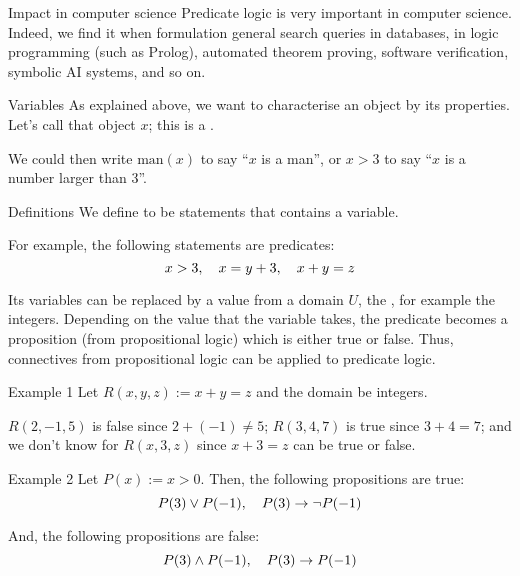 \documentclass{article}
\begin{document}
\begin{parag}{Impact in computer science}
    Predicate logic is very important in computer science. Indeed, we find it when formulation general search queries in databases, in logic programming (such as Prolog), automated theorem proving, software verification, symbolic AI systems, and so on.
\end{parag}

\begin{parag}{Variables}
    As explained above, we want to characterise an object by its properties. Let's call that object $x$; this is a .

    We could then write $\text{man}\left(x\right)$ to say ``$x$ is a man'', or $x > 3$ to say ``$x$ is a number larger than 3''.
\end{parag}

\begin{parag}{Definitions}
    We define  to be statements that contains a variable.

    For example, the following statements are predicates: 
    \[x > 3, \quad x = y + 3, \quad x + y = z\]
    
    Its variables can be replaced by a value from a domain $U$, the , for example the integers. Depending on the value that the variable takes, the predicate becomes a proposition (from propositional logic) which is either true or false. Thus, connectives from propositional logic can be applied to predicate logic.
\end{parag}

\begin{parag}{Example 1}
    Let $R\left(x, y, z\right) := x + y = z$ and the domain be integers.

    $R\left(2, -1, 5\right)$ is false since $2 + \left(-1\right) \neq 5$; $R\left(3, 4, 7\right)$ is true since $3 + 4 = 7$; and we don't know for $R\left(x, 3, z\right)$ since $x + 3 = z$ can be true or false. 
\end{parag}

\begin{parag}{Example 2}
    Let $P\left(x\right) := x > 0$. Then, the following propositions are true: 
    \[P\left(3\right) \lor P\left(-1\right), \mathspace P\left(3\right) \to \lnot P\left(-1\right)\]
    
    And, the following propositions are false: 
    \[P\left(3\right) \land P\left(-1\right), \mathspace P\left(3\right) \to P\left(-1\right)\]
\end{parag}
\end{document}
